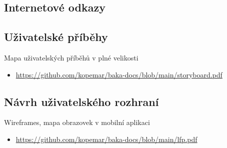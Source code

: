 \documentclass[twoside]{ctuthesis}
\begin{document}
\begin{enumerate}[label=\textbf{O\arabic*.}]
%
%

\printbibliography[title={Seznam použité literatury}]

\appendix

%



\chapter{Internetové odkazy}
\section{Uživatelské příběhy}\label{sec:user-story}

Mapa uživatelských příběhů v plné velikosti
\begin{itemize}
	\item \url{https://github.com/kopemar/baka-docs/blob/main/storyboard.pdf}
\end{itemize}


\section{Návrh uživatelského rozhraní}\label{sec:ui}

Wireframes, mapa obrazovek v mobilní aplikaci
\begin{itemize}
	\item \url{https://github.com/kopemar/baka-docs/blob/main/lfp.pdf}
\end{itemize}





\end{enumerate}
\end{document}
